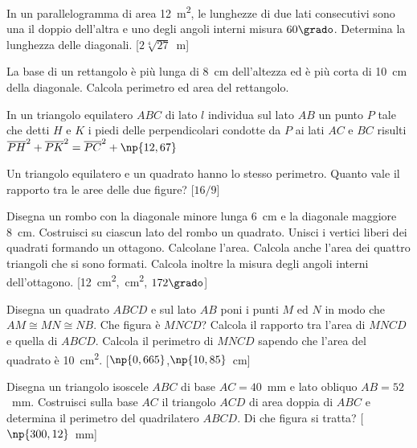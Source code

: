 \begin{multicols}{2}
\begin{esercizio}
\label{ese:7.36}
In un parallelogramma di area 12~m\textsuperscript{2}, le lunghezze 
di due lati consecutivi sono una il doppio dell'altra e uno degli 
angoli interni misura $60\grado$. Determina la lunghezza delle 
diagonali.
\hfill[$2\sqrt[4]{27}$~m]
\end{esercizio}

\begin{esercizio}
\label{ese:7.38}
La base di un rettangolo è più lunga di 8~cm dell'altezza ed è più 
corta di 10~cm della diagonale. Calcola perimetro ed area del 
rettangolo.
\end{esercizio}

\begin{esercizio}
\label{ese:7.39}
In un triangolo equilatero $ABC$ di lato $l$ individua sul lato $AB$ 
un punto $P$ tale che detti $H$ e $K$ i piedi delle perpendicolari 
condotte da $P$ ai lati $AC$ e $BC$ risulti 
$\overline{PH}^2+\overline{PK}^2=\overline{PC}^2+\np{12,67}$
\end{esercizio}

\begin{esercizio}
\label{ese:7.40}
Un triangolo equilatero e un quadrato hanno lo stesso perimetro. 
Quanto vale il rapporto tra le aree delle due figure?
\hfill[$16/9$]
\end{esercizio}

\begin{esercizio}
\label{ese:7.43}
Disegna un rombo con la diagonale minore lunga 6~cm e la diagonale 
maggiore 8~cm. Costruisci su ciascun lato del rombo un quadrato. 
Unisci i vertici liberi dei quadrati formando un ottagono. Calcolane 
l'area. Calcola anche l'area dei quattro triangoli che si sono 
formati. Calcola inoltre la misura degli angoli interni dell'ottagono.
\hfill[12~cm\textsuperscript{2},~cm\textsuperscript{2},\quad 
$172\grado$]
\end{esercizio}

\begin{esercizio}
\label{ese:7.44}
Disegna un quadrato $ABCD$ e sul lato $AB$ poni i punti $M$ ed $N$ in 
modo che $AM\cong MN\cong NB$. Che figura è $MNCD$? Calcola il 
rapporto tra l'area di $MNCD$ e quella di $ABCD$. Calcola il 
perimetro di $MNCD$ sapendo che l'area del quadrato è 
10~cm\textsuperscript{2}.
\hfill[$\np{0,665}$,\quad $\np{10,85}$~cm]
\end{esercizio}

\begin{esercizio}
\label{ese:7.45}
Disegna un triangolo isoscele $ABC$ di base $AC=40$~mm e lato obliquo 
$AB=52$~mm. Costruisci sulla base $AC$ il triangolo $ACD$ di area 
doppia di $ABC$ e determina il perimetro del quadrilatero $ABCD$. Di 
che figura si tratta?
\hfill[$\np{300,12}$~mm]
\end{esercizio}


\end{multicols}
